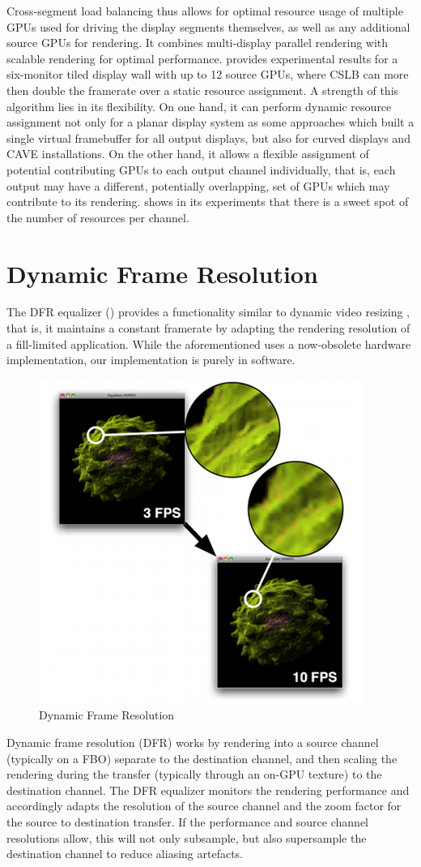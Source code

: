 Cross-segment load balancing thus allows for optimal resource usage of multiple
GPUs used for driving the display segments themselves, as well as any additional
source GPUs for rendering. It combines multi-display parallel rendering with
scalable rendering for optimal performance. \cite{EEP:11} provides experimental
results for a six-monitor tiled display wall with up to 12 source GPUs, where
CSLB can more then double the framerate over a static resource assignment. A
strength of this algorithm lies in its flexibility. On one hand, it can perform
dynamic resource assignment not only for a planar display system as some
approaches which built a single virtual framebuffer for all output displays, but
also for curved displays and CAVE installations. On the other hand, it allows a
flexible assignment of potential contributing GPUs to each output channel
individually, that is, each output may have a different, potentially
overlapping, set of GPUs which may contribute to its rendering. \cite{EEP:11}
shows in its experiments that there is a sweet spot of the number of resources
per channel.

\section{Dynamic Frame Resolution}

The DFR equalizer () provides a functionality similar to dynamic
video resizing \cite{MBDM:97}, that is, it maintains a constant framerate by
adapting the rendering resolution of a fill-limited application. While the aforementioned uses a now-obsolete hardware implementation, our implementation is purely in software.

\begin{figure}
  \includegraphics[width=.382\textwidth]{images/dfr}
  \caption{\label{fdfr}Dynamic Frame Resolution}
\end{figure}
Dynamic frame resolution (DFR) works by rendering into a source channel
(typically on a FBO) separate to the destination channel, and then scaling the
rendering during the transfer (typically through an on-GPU texture) to the
destination channel. The DFR equalizer monitors the rendering performance and
accordingly adapts the resolution of the source channel and the zoom factor for
the source to destination transfer. If the performance and source channel
resolutions allow, this will not only subsample, but also supersample the
destination channel to reduce aliasing artefacts.

